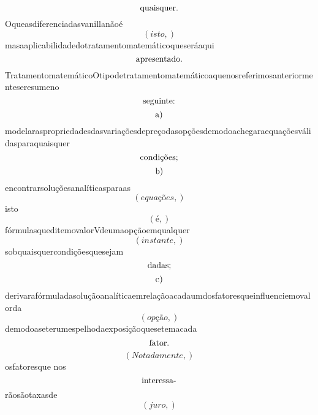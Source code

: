 \documentclass{article}
\begin{document}
\begin{equation}
$quaisquer.$
\end{equation}Oqueasdiferenciadasvanillanãoé\begin{equation}
\left( isto,\right)
\end{equation}masaaplicabilidadedotratamentomatemáticoqueseráaqui\begin{equation}
$apresentado.$
\end{equation}TratamentomatemáticoOtipodetratamentomatemáticoaquenosreferimosanteriormenteseresumeno\begin{equation}
$seguinte:$
\end{equation}\begin{equation}
$a)$
\end{equation}modelaraspropriedadesdasvariaçõesdepreçodasopçõesdemodoachegaraequaçõesválidasparaquaisquer\begin{equation}
$condições;$
\end{equation}\begin{equation}
$b)$
\end{equation}encontrarsoluçõesanalíticasparaas\begin{equation}
\left( equações,\right)
\end{equation}isto\begin{equation}
\left( é,\right)
\end{equation}fórmulasqueditemovalorVdeumaopçãoemqualquer\begin{equation}
\left( instante,\right)
\end{equation}sobquaisquercondiçõesquesejam\begin{equation}
$dadas;$
\end{equation}\begin{equation}
$c)$
\end{equation}derivarafórmuladasoluçãoanalíticaemrelaçãoacadaumdosfatoresqueinfluenciemovalorda\begin{equation}
\left( opção,\right)
\end{equation}demodoaseterumespelhodaexposiçãoquesetemacada\begin{equation}
$fator.$
\end{equation}\begin{equation}
\left( Notadamente,\right)
\end{equation}osfatoresque nos\begin{equation}
$interessa-$
\end{equation}rãosãotaxasde\begin{equation}
\left( juro,\right)
\end{equation}\begin{equation}

\end{equation}
\end{document}
